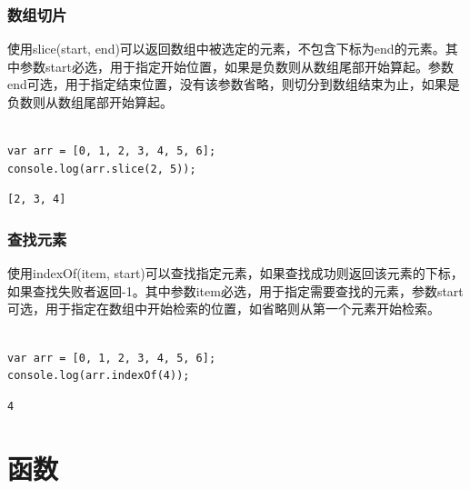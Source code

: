 \subsection{数组切片}

使用slice(start, end)可以返回数组中被选定的元素，不包含下标为end的元素。其中参数start必选，用于指定开始位置，如果是负数则从数组尾部开始算起。参数end可选，用于指定结束位置，没有该参数省略，则切分到数组结束为止，如果是负数则从数组尾部开始算起。 \\

 \\

\begin{lstlisting}[style=htmlcssjs]
var arr = [0, 1, 2, 3, 4, 5, 6];
console.log(arr.slice(2, 5));
\end{lstlisting}

\begin{tcolorbox}
	\begin{verbatim}
[2, 3, 4]
	\end{verbatim}
\end{tcolorbox}

\subsection{查找元素}

使用indexOf(item, start)可以查找指定元素，如果查找成功则返回该元素的下标，如果查找失败者返回-1。其中参数item必选，用于指定需要查找的元素，参数start可选，用于指定在数组中开始检索的位置，如省略则从第一个元素开始检索。 \\

 \\

\begin{lstlisting}[style=htmlcssjs]
var arr = [0, 1, 2, 3, 4, 5, 6];
console.log(arr.indexOf(4));
\end{lstlisting}

\begin{tcolorbox}
	\begin{verbatim}
4
	\end{verbatim}
\end{tcolorbox}

\newpage

\chapter{函数}

